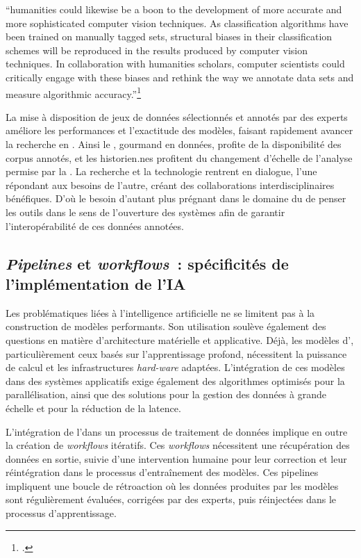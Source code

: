 \begin{kwote}
``humanities could likewise be a boon to the development of more accurate and more sophisticated computer vision techniques. As classification algorithms have been trained on manually tagged sets, structural biases in their classification schemes will be reproduced in the results produced by computer vision techniques. In collaboration with humanities scholars, computer scientists could critically engage with these biases and rethink the way we annotate data sets and measure algorithmic accuracy.''\footcite[p.12]{wevers_visual_2020}
\end{kwote}

La mise à disposition de jeux de données sélectionnés et annotés par des experts améliore les performances et l'exactitude des modèles, faisant rapidement avancer la recherche en \cv. Ainsi le \dl, gourmand en données, profite de la disponibilité des corpus annotés, et les historien.nes profitent du changement d'échelle de l'analyse permise par la \cv. La recherche et la technologie rentrent en dialogue, l'une répondant aux besoins de l'autre, créant des collaborations interdisciplinaires bénéfiques. D'où le besoin d'autant plus prégnant dans le domaine du \ml de penser les outils dans le sens de l'ouverture des systèmes afin de garantir l'interopérabilité de ces données annotées.

\subsection{\emph{Pipelines} et \emph{workflows}~: spécificités de l'implémentation de l'IA}

Les problématiques liées à l'intelligence artificielle ne se limitent pas à la construction de modèles performants. Son utilisation soulève également des questions en matière d'architecture matérielle et applicative. Déjà, les modèles d'\ia, particulièrement ceux basés sur l'apprentissage profond, nécessitent la puissance de calcul et les infrastructures \textit{hard-ware} adaptées. L'intégration de ces modèles dans des systèmes applicatifs exige également des algorithmes optimisés pour la parallélisation, ainsi que des solutions pour la gestion des données à grande échelle et pour la réduction de la latence. 

L'intégration de l'\ia dans un processus de traitement de données implique en outre la création de \textit{workflows} itératifs. Ces \textit{workflows} nécessitent une récupération des données en sortie, suivie d'une intervention humaine pour leur correction et leur réintégration dans le processus d'entraînement des modèles. Ces pipelines impliquent une boucle de rétroaction où les données produites par les modèles sont régulièrement évaluées, corrigées par des experts, puis réinjectées dans le processus d'apprentissage.

